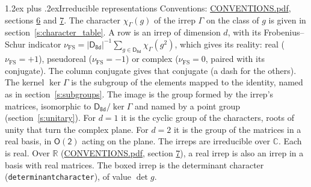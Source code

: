 \documentclass[10pt,a4paper]{article}
\makeatletter
\renewcommand\section{\@startsection{section}{1}{\z@}{-3ex plus -1ex minus -.2ex}%
  {1.2ex plus .2ex}{\normalfont\large\sffamily\bfseries\color{parttitle}}}
\numberwithin{equation}{section}
\newcommand{\grp}[1]{\mathsf{#1}}
\newcommand{\irchar}[1]{\chi_{#1}}
\newcommand{\fsind}{\nu_{\mathrm{FS}}}
\makeatother
\begin{document}
\section{Irreducible representations}\label{s:irreps}
Conventions: \href{../../CONVENTIONS.pdf}{CONVENTIONS.pdf}, sections \href{../../CONVENTIONS.pdf\#conv.6}{6} and \href{../../CONVENTIONS.pdf\#conv.7}{7}.
\leavevmode\label{n:function.character}\label{n:irrep.Gamma}The character $\irchar{\Gamma}(g)$ of the irrep $\Gamma$ on the class of $g$ is given in section~\ref{s:character_table}.
\leavevmode\label{n:index.dimension}\label{n:index.frobenius}\label{n:head.irrep}\label{n:head.reality}A row is an irrep of dimension $d$, with its Frobenius--Schur indicator $\fsind = |\grp{D_{8d}}|^{-1}\allowbreak\sum_{g\in\grp{D_{8d}}}\irchar{\Gamma}(g^2)$, which gives its reality: real ($\fsind = +1$), pseudoreal ($\fsind = -1$) or complex ($\fsind = 0$, paired with its conjugate). \label{n:head.conjugate}The column conjugate gives that conjugate (a dash for the others). \label{n:head.kernel}The kernel $\ker\Gamma$ is the subgroup of the elements mapped to the identity, named as in section~\ref{s:subgroups}. \label{n:head.image}The image is the group formed by the irrep's matrices, isomorphic to $\grp{D_{8d}}/\ker\Gamma$ and named by a point group (section~\ref{s:unitary}). For $d = 1$ it is the cyclic group of the characters, roots of unity that turn the complex plane. For $d = 2$ it is the group of the matrices in a real basis, in $\grp{O(2)}$ acting on the plane. The irreps are irreducible over $\mathbb{C}$. Each is real. Over $\mathbb{R}$ (\href{../../CONVENTIONS.pdf}{CONVENTIONS.pdf}, section \href{../../CONVENTIONS.pdf\#conv.7}{7}), a real irrep is also an irrep in a basis with real matrices. \label{n:mark.determinant}The boxed irrep is the determinant character (\texttt{determinantcharacter}), of value $\det g$.
\setlength{\emergencystretch}{2em}\par\setlength{\emergencystretch}{0pt}
\end{document}
